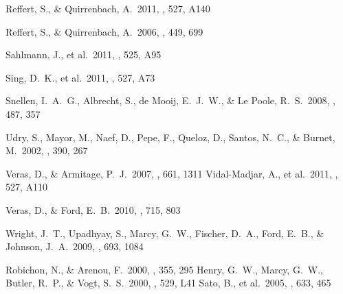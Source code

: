 \documentclass[12pt,preprint]{emulateapj}
\begin{document}
\begin{thebibliography}{}
 Reffert, S., \& Quirrenbach, A.\ 2011, \aap, 527, A140 

 Reffert, S., \& Quirrenbach, A.\ 2006, \aap, 449, 699 

 Sahlmann, J., et al.\ 2011, \aap, 525, A95 






 Sing, D.~K., et al.\ 2011, \aap, 527, A73 


 Snellen, I.~A.~G., Albrecht, S., de Mooij, E.~J.~W., \& Le Poole, R.~S.\ 2008, \aap, 487, 357 

 Udry, S., Mayor, M., Naef, D., Pepe, F., Queloz, D., Santos, N.~C., \& Burnet, M.\ 2002, \aap, 390, 267 

 Veras, D., \& Armitage, P.~J.\ 2007, \apj, 661, 1311 
 Vidal-Madjar, A., et al.\ 2011, \aap, 527, A110 


 Veras, D., \& Ford, E.~B.\ 2010, \apj, 715, 803 




 Wright, J.~T., Upadhyay, 
S., Marcy, G.~W., Fischer, D.~A., Ford, E.~B., 
\& Johnson, J.~A.\ 2009, \apj, 693, 1084 








 Robichon, N., \& Arenou, F.\ 2000, \aap, 355, 295 
 Henry, G.~W., Marcy, 
G.~W., Butler, R.~P., \& Vogt, S.~S.\ 2000, \apjl, 529, L41 
 Sato, B., et al.\ 2005, 
\apj, 633, 465 







\end{thebibliography}
\end{document}

